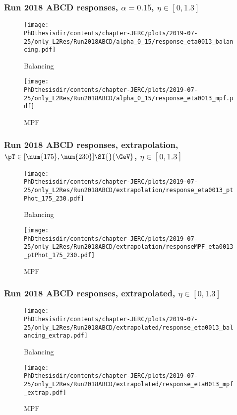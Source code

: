 \begin{frame}
\frametitle{Run 2018 ABCD responses, $\alpha=\num{0.15}$, $\eta\in [\num{0},\num{1.3}]$}
\begin{minipage}{.45\textwidth}
\begin{figure}
\texttt{[image: \\PhDthesisdir/contents/chapter-JERC/plots/2019-07-25/only\_L2Res/Run2018ABCD/alpha\_0\_15/response\_eta0013\_balancing.pdf]}
\caption{Balancing}
\end{figure}
\end{minipage}
\hfill
\begin{minipage}{.45\textwidth}
\begin{figure}
\texttt{[image: \\PhDthesisdir/contents/chapter-JERC/plots/2019-07-25/only\_L2Res/Run2018ABCD/alpha\_0\_15/response\_eta0013\_mpf.pdf]}
\caption{MPF}
\end{figure}
\end{minipage}
\end{frame}

\begin{frame}
\frametitle{Run 2018 ABCD responses, extrapolation, $\pT\in [\num{175},\num{230}]\SI{}{\GeV}$, $\eta\in [\num{0},\num{1.3}]$}
\begin{minipage}{.45\textwidth}
\begin{figure}
\texttt{[image: \\PhDthesisdir/contents/chapter-JERC/plots/2019-07-25/only\_L2Res/Run2018ABCD/extrapolation/response\_eta0013\_ptPhot\_175\_230.pdf]}
\caption{Balancing}
\end{figure}
\end{minipage}
\hfill
\begin{minipage}{.45\textwidth}
\begin{figure}
\texttt{[image: \\PhDthesisdir/contents/chapter-JERC/plots/2019-07-25/only\_L2Res/Run2018ABCD/extrapolation/responseMPF\_eta0013\_ptPhot\_175\_230.pdf]}
\caption{MPF}
\end{figure}
\end{minipage}
\end{frame}

\begin{frame}
\frametitle{Run 2018 ABCD responses, extrapolated, $\eta\in [\num{0},\num{1.3}]$}
\begin{minipage}{.45\textwidth}
\begin{figure}
\texttt{[image: \\PhDthesisdir/contents/chapter-JERC/plots/2019-07-25/only\_L2Res/Run2018ABCD/extrapolated/response\_eta0013\_balancing\_extrap.pdf]}
\caption{Balancing}
\end{figure}
\end{minipage}
\hfill
\begin{minipage}{.45\textwidth}
\begin{figure}
\texttt{[image: \\PhDthesisdir/contents/chapter-JERC/plots/2019-07-25/only\_L2Res/Run2018ABCD/extrapolated/response\_eta0013\_mpf\_extrap.pdf]}
\caption{MPF}
\end{figure}
\end{minipage}
\end{frame}
